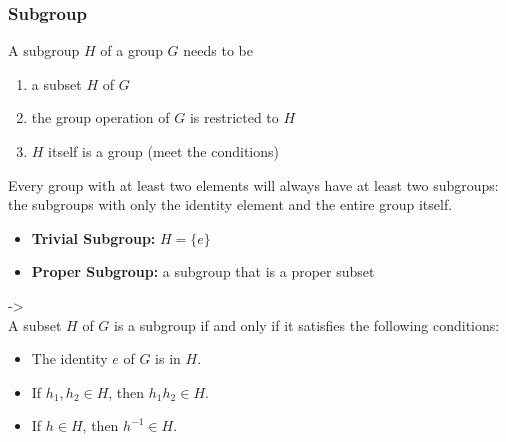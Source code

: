 \documentclass{article}
\begin{document}
\subsubsection{Subgroup}
A subgroup $H$ of a group $G$ needs to be
\begin{enumerate}
    \item a subset $H$ of $G$
    \item the group operation of $G$ is restricted to $H$
    \item $H$ itself is a group (meet the conditions)
\end{enumerate}
Every group with at least two elements will always have at least two subgroups: the subgroups with only the identity element and the entire group itself.
\begin{itemize}
    \item \textbf{Trivial Subgroup:} $H=\{e\}$
    \item \textbf{Proper Subgroup:} a subgroup that is a proper subset
\end{itemize}
->\\A subset $H$ of $G$ is a subgroup if and only if it satisfies the following conditions:
\begin{itemize}
    \item The identity $e$ of $G$ is in $H$.
    \item If $h_1,h_2\in H$, then $h_1 h_2\in H$.
    \item If $h\in H$, then $h^{-1}\in H$.
\end{itemize}
\end{document}
